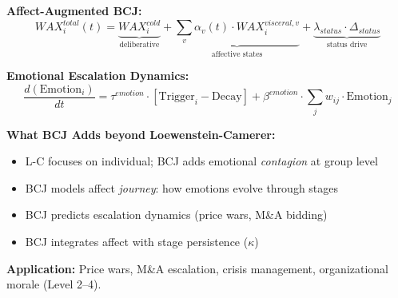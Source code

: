 \begin{tcolorbox}[colback=orange!5!white, colframe=orange!75!black,
    title=Theorem BCJ-T42: Affect \& Emotion as Special Case]
\textbf{Affect-Augmented BCJ:}
\begin{equation}
WAX_i^{total}(t) = \underbrace{WAX_i^{cold}}_{\text{deliberative}} + \underbrace{\sum_v \alpha_v(t) \cdot WAX_i^{visceral,v}}_{\text{affective states}} + \underbrace{\lambda_{status} \cdot \Delta_{status}}_{\text{status drive}}
\end{equation}

\textbf{Emotional Escalation Dynamics:}
\begin{equation}
\frac{d(\text{Emotion}_i)}{dt} = \tau^{emotion} \cdot \left[\text{Trigger}_i - \text{Decay}\right] + \beta^{emotion} \cdot \sum_j w_{ij} \cdot \text{Emotion}_j
\end{equation}

\textbf{What BCJ Adds beyond Loewenstein-Camerer:}
\begin{itemize}[nosep]
\item L-C focuses on individual; BCJ adds emotional \textit{contagion} at group level
\item BCJ models affect \textit{journey}: how emotions evolve through stages
\item BCJ predicts escalation dynamics (price wars, M\&A bidding)
\item BCJ integrates affect with stage persistence ($\kappa$)
\end{itemize}

\textbf{Application:} Price wars, M\&A escalation, crisis management, organizational morale (Level 2--4).
\end{tcolorbox}

